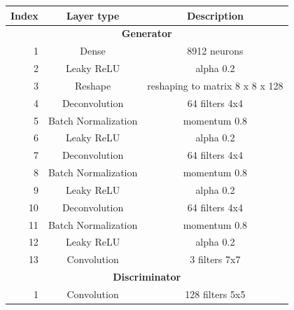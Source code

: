 \documentclass[]{article}
\begin{document}
\begin{table}[h!]
	\centering
	\begin{tabular}{|r|c|c|}
		\hline
		\multicolumn{1}{|c|}{\textbf{Index}} & \textbf{Layer type} & \textbf{Description}                  \\ \hline
		\multicolumn{3}{|c|}{\textbf{Generator}}                                                           \\ \hline
		1                                    & Dense               & 8912 neurons                          \\ \hline
		2                                    & Leaky ReLU          & alpha 0.2                             \\ \hline
		3                                    & Reshape             & reshaping to matrix 8 x 8 x 128       \\ \hline
		4                                    & Deconvolution       & 64 filters 4x4                        \\ \hline
		5                                    & Batch Normalization & momentum 0.8                          \\ \hline
		6                                    & Leaky ReLU          & alpha 0.2                             \\ \hline
		7                                    & Deconvolution       & 64 filters 4x4                        \\ \hline
		8                                    & Batch Normalization & momentum 0.8                          \\ \hline
		9                                    & Leaky ReLU          & alpha 0.2                             \\ \hline
		10                                   & Deconvolution       & 64 filters 4x4                        \\ \hline
		11                                   & Batch Normalization & momentum 0.8                          \\ \hline
		12                                   & Leaky ReLU          & alpha 0.2                             \\ \hline
		13                                   & Convolution         & 3 filters 7x7                         \\ \hline
		\multicolumn{3}{|c|}{\textbf{Discriminator}}                                                       \\ \hline
		1                                    & Convolution         & 128 filters 5x5                       \\ \hline

\end{tabular}
\end{table}
\end{document}
